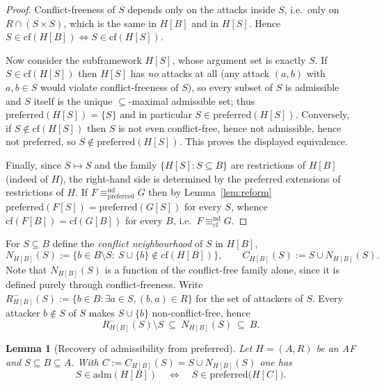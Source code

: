 \documentclass{amsart}
\newtheorem{lemma}[theorem]{Lemma}
\theoremstyle{remark}
\begin{document}
\begin{proof}
Conflict-freeness of $S$ depends only on the attacks inside $S$, i.e.\ only on
$R\cap(S\times S)$, which is the same in $H[B]$ and in $H[S]$.  Hence
$S\in\mathrm{cf}(H[B])\iff S\in\mathrm{cf}(H[S])$.

Now consider the subframework $H[S]$, whose argument set is exactly $S$.  If
$S\in\mathrm{cf}(H[S])$ then $H[S]$ has \emph{no} attacks at all (any attack
$(a,b)$ with $a,b\in S$ would violate conflict-freeness of $S$), so every subset
of $S$ is admissible and $S$ itself is the unique $\subseteq$-maximal admissible
set; thus $\mathrm{preferred}(H[S])=\{S\}$ and in particular
$S\in\mathrm{preferred}(H[S])$.  Conversely, if $S\notin\mathrm{cf}(H[S])$ then
$S$ is not even conflict-free, hence not admissible, hence not preferred, so
$S\notin\mathrm{preferred}(H[S])$.  This proves the displayed equivalence.

Finally, since $S\mapsto S$ and the family $\{H[S]:S\subseteq B\}$ are
restrictions of $H[B]$ (indeed of $H$), the right-hand side is determined by the
preferred extensions of restrictions of $H$.  If
$F\equiv^{\mathrm{nd}}_{\mathrm{preferred}}G$ then by
Lemma~\ref{lem:reform} $\mathrm{preferred}(F[S])=\mathrm{preferred}(G[S])$ for
every $S$, whence $\mathrm{cf}(F[B])=\mathrm{cf}(G[B])$ for every $B$, i.e.\
$F\equiv^{\mathrm{nd}}_{\mathrm{cf}}G$.
\end{proof}

For $S\subseteq B$ define the \emph{conflict neighbourhood} of $S$ in $H[B]$,
\[
N_{H[B]}(S):=\bigl\{b\in B\setminus S:\ S\cup\{b\}\notin\mathrm{cf}(H[B])\bigr\},
\qquad C_{H[B]}(S):=S\cup N_{H[B]}(S).
\]
Note that $N_{H[B]}(S)$ is a function of the conflict-free family alone, since it
is defined purely through conflict-freeness.  Write
$R^-_{H[B]}(S):=\{b\in B:\exists a\in S,(b,a)\in R\}$ for the set of attackers of
$S$.  Every attacker $b\notin S$ of $S$ makes $S\cup\{b\}$ non-conflict-free,
hence
\begin{equation}\label{eq:attackers-in-N}
R^-_{H[B]}(S)\setminus S\ \subseteq\ N_{H[B]}(S)\ \subseteq\ B .
\end{equation}

\begin{lemma}[Recovery of admissibility from preferred]\label{lem:recover}
Let $H=(A,R)$ be an AF and $S\subseteq B\subseteq A$.  With $C:=C_{H[B]}(S)=
S\cup N_{H[B]}(S)$ one has
\[
S\in\mathrm{adm}(H[B])
\quad\Longleftrightarrow\quad
S\in\mathrm{preferred}\bigl(H[C]\bigr).
\]
\end{lemma}
\end{document}
